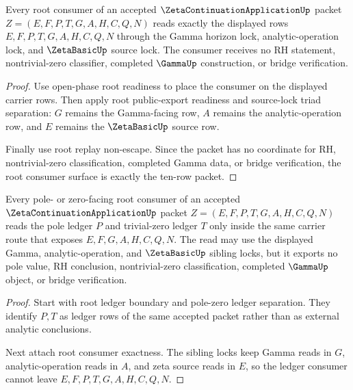 \begin{theorem}
\label{thm:zeta-continuation-application-root-consumer-exactness}
Every root consumer of an accepted $\ZetaContinuationApplicationUp$ packet
$Z=(E,F,P,T,G,A,H,C,Q,N)$ reads exactly the displayed rows
$E,F,P,T,G,A,H,C,Q,N$ through the Gamma horizon lock, analytic-operation lock,
and $\ZetaBasicUp$ source lock. The consumer receives no RH statement,
nontrivial-zero classifier, completed $\GammaUp$ construction, or bridge
verification.
\end{theorem}
\begin{proof}
Use open-phase root readiness to place the consumer on the displayed carrier
rows. Then apply root public-export readiness and source-lock triad separation:
$G$ remains the Gamma-facing row, $A$ remains the analytic-operation row, and
$E$ remains the $\ZetaBasicUp$ source row.

Finally use root replay non-escape. Since the packet has no coordinate for RH,
nontrivial-zero classification, completed Gamma data, or bridge verification,
the root consumer surface is exactly the ten-row packet.
\end{proof}

\begin{theorem}
\label{thm:zeta-continuation-application-root-pole-zero-consumer-readiness}
Every pole- or zero-facing root consumer of an accepted
$\ZetaContinuationApplicationUp$ packet $Z=(E,F,P,T,G,A,H,C,Q,N)$ reads the
pole ledger $P$ and trivial-zero ledger $T$ only inside the same carrier route
that exposes $E,F,G,A,H,C,Q,N$. The read may use the displayed Gamma,
analytic-operation, and $\ZetaBasicUp$ sibling locks, but it exports no pole
value, RH conclusion, nontrivial-zero classification, completed $\GammaUp$
object, or bridge verification.
\end{theorem}
\begin{proof}
Start with root ledger boundary and pole-zero ledger separation. They identify
$P,T$ as ledger rows of the same accepted packet rather than as external
analytic conclusions.

Next attach root consumer exactness. The sibling locks keep Gamma reads in
$G$, analytic-operation reads in $A$, and zeta source reads in $E$, so the
ledger consumer cannot leave $E,F,P,T,G,A,H,C,Q,N$.
\end{proof}

